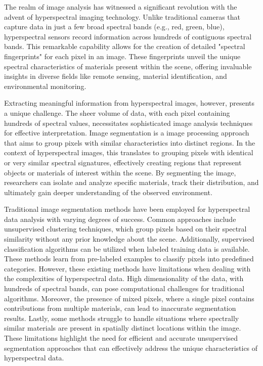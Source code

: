 The realm of image analysis has witnessed a significant revolution with the advent of hyperspectral imaging technology. Unlike traditional cameras that capture data in just a few broad spectral bands (e.g., red, green, blue), hyperspectral sensors record information across hundreds of contiguous spectral bands. This remarkable capability allows for the creation of detailed "spectral fingerprints" for each pixel in an image. These fingerprints unveil the unique spectral characteristics of materials present within the scene, offering invaluable insights in diverse fields like remote sensing, material identification, and environmental monitoring.

Extracting meaningful information from hyperspectral images, however, presents a unique challenge. The sheer volume of data, with each pixel containing hundreds of spectral values, necessitates sophisticated image analysis techniques for effective interpretation. Image segmentation is a image processing approach that aims to group pixels with similar characteristics into distinct regions. In the context of hyperspectral images, this translates to grouping pixels with identical or very similar spectral signatures, effectively creating regions that represent objects or materials of interest within the scene. By segmenting the image, researchers can isolate and analyze specific materials, track their distribution, and ultimately gain deeper understanding of the observed environment.

Traditional image segmentation methods have been employed for hyperspectral data analysis with varying degrees of success. Common approaches include unsupervised clustering techniques, which group pixels based on their spectral similarity without any prior knowledge about the scene. Additionally, supervised classification algorithms can be utilized when labeled training data is available. These methods learn from pre-labeled examples to classify pixels into predefined categories. However, these existing methods have limitations when dealing with the complexities of hyperspectral data. High dimensionality of the data, with hundreds of spectral bands, can pose computational challenges for traditional algorithms. Moreover, the presence of mixed pixels, where a single pixel contains contributions from multiple materials, can lead to inaccurate segmentation results. Lastly, some methods struggle to handle situations where spectrally similar materials are present in spatially distinct locations within the image. These limitations highlight the need for efficient and accurate unsupervised segmentation approaches that can effectively address the unique characteristics of hyperspectral data.